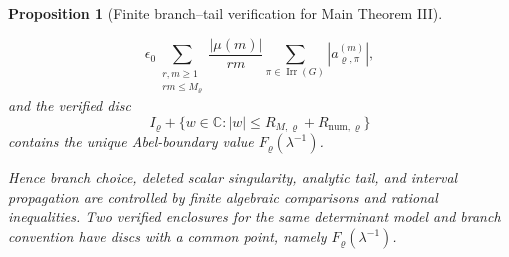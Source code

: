 \documentclass[11pt,a4paper]{amsart}
\theoremstyle{plain}
\newtheorem{proposition}[theorem]{Proposition}
\theoremstyle{definition}
\theoremstyle{remark}
\DeclareMathOperator{\Irr}{Irr}
\newcommand{\CC}{\mathbb{C}}
\begin{document}
\begin{proposition}[Finite branch--tail verification for Main Theorem III]
\begin{enumerate}[label=\textup{(\roman*)},leftmargin=*]
\[        \epsilon_0
        \sum_{\substack{r,m\ge1\\rm\le M_\varrho}}
          \frac{|\mu(m)|}{rm}
          \sum_{\pi\in\Irr(G)}|a_{\varrho,\pi}^{(m)}|,
      \]
      and the verified disc
      \[
        I_\varrho+
        \{w\in\CC:|w|\le R_{M,\varrho}+R_{\mathrm{num},\varrho}\}
      \]
      contains the unique Abel-boundary value \(F_\varrho(\lambda^{-1})\).
  \end{enumerate}
  Hence branch choice, deleted scalar singularity, analytic tail, and interval
  propagation are controlled by finite algebraic comparisons and rational
  inequalities.  Two verified enclosures for the same determinant model and
  branch convention have discs with a common point, namely
  \(F_\varrho(\lambda^{-1})\).
\end{proposition}
\end{document}
